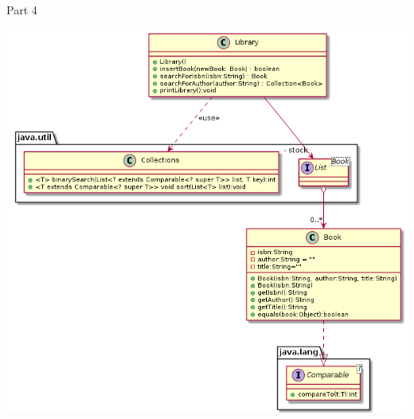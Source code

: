 	\begin{frame}{Part 4}
		
		\begin{center}
			\includegraphics[scale=.34]{07_collection/hands_on_04.png}
		\end{center}
		
		
		
	\end{frame}
	
	
